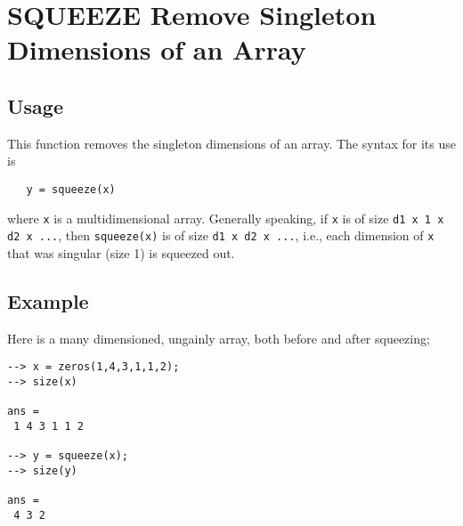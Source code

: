 \section{SQUEEZE Remove Singleton Dimensions of an Array}

\subsection{Usage}

This function removes the singleton dimensions of an array.  The
syntax for its use is
\begin{verbatim}
   y = squeeze(x)
\end{verbatim}
where \verb|x| is a multidimensional array.  Generally speaking, if
\verb|x| is of size \verb|d1 x 1 x d2 x ...|, then \verb|squeeze(x)| is of
size \verb|d1 x d2 x ...|, i.e., each dimension of \verb|x| that was
singular (size 1) is squeezed out.
\subsection{Example}

Here is a many dimensioned, ungainly array, both before and 
after squeezing;
\begin{verbatim}
--> x = zeros(1,4,3,1,1,2);
--> size(x)

ans = 
 1 4 3 1 1 2 

--> y = squeeze(x);
--> size(y)

ans = 
 4 3 2 
\end{verbatim}
